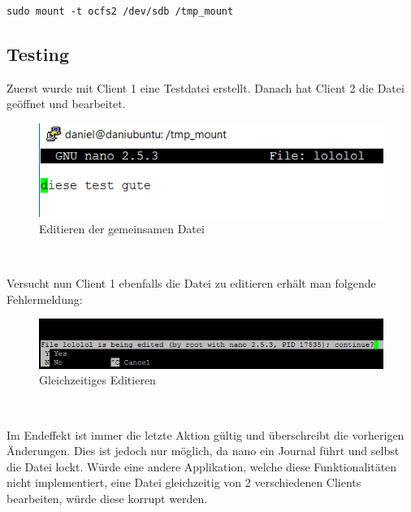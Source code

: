 \texttt{sudo mount -t ocfs2 /dev/sdb /tmp\_mount}

\subsection{Testing}
Zuerst wurde mit Client 1 eine Testdatei erstellt. Danach hat Client 2 die Datei geöffnet und bearbeitet.
\begin{figure}[!h]
	\begin{center}
		\includegraphics[width=0.5\linewidth]{images/edit.png}
		\caption{Editieren der gemeinsamen Datei}
		\label{edit}
	\end{center}
\end{figure}\

Versucht nun Client 1 ebenfalls die Datei zu editieren erhält man folgende Fehlermeldung:
\begin{figure}[!h]
	\begin{center}
		\includegraphics[width=0.8\linewidth]{images/error.png}
		\caption{Gleichzeitiges Editieren}
		\label{error}
	\end{center}
\end{figure}\

Im Endeffekt ist immer die letzte Aktion gültig und überschreibt die vorherigen Änderungen.
Dies ist jedoch nur möglich, da nano ein Journal führt und selbst die Datei lockt. Würde eine andere Applikation, welche diese Funktionalitäten nicht implementiert, eine Datei gleichzeitig von 2 verschiedenen Clients bearbeiten, würde diese korrupt werden. 